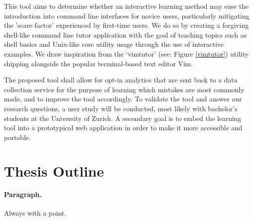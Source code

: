 This tool aims to determine whether an interactive learning method may ease the
introduction into command line interfaces for novice users, particularly
mitigating the 'scare factor' experienced by first-time users. We do so by
creating a forgiving shell-like command line tutor application with the goal of
teaching topics such as shell  basics and Unix-like core utility usage through
the use of interactive examples. We draw inspiration from the
`vimtutor'\cite{pierce_ware_smith_moolenaar_2019} (see: Figure \ref{vimtutor})
utility shipping alongside the popular terminal-based text editor Vim. 

The proposed tool shall allow for opt-in analytics that are sent back to a data
collection service for the purpose of learning which mistakes are most commonly
made, and to improve the tool accordingly. To validate the tool and answer our
research questions, a user study will be conducted, most likely with bachelor's
students at the University of Zurich. A secondary goal is to embed the learning
tool into a prototypical web application in order to make it more accessible
and portable. 

\section{Thesis Outline}

\paragraph{Paragraph.} Always with a point. {}
